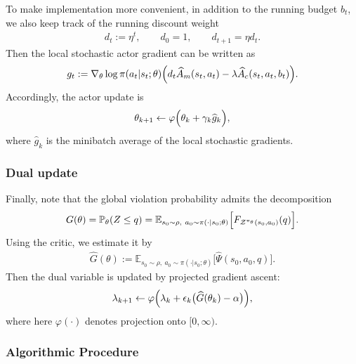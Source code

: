 To make implementation more convenient, in addition to the running budget $b_t$, we also keep track of the running discount weight
\begin{align}
    d_t:=\eta^t,
    \qquad d_0=1,
    \qquad d_{t+1}=\eta d_t.
\end{align}
Then the local stochastic actor gradient can be written as
\begin{align}
    g_t
    :=
    \nabla_{\theta}\log\pi(a_t|s_t;\theta)
    \Bigl(
        d_t\widehat{A}_m(s_t,a_t)
        -
        \lambda \widehat{A}_c(s_t,a_t,b_t)
    \Bigr).
\end{align}
Accordingly, the actor update is
\begin{align}
    \theta_{k+1}
    \gets
    \varphi\Bigl(
        \theta_k+\gamma_k \widehat{g}_k
    \Bigr),
\end{align}
where $\widehat{g}_k$ is the minibatch average of the local stochastic gradients.

\subsubsection{Dual update}

Finally, note that the global violation probability admits the decomposition
\begin{align}
    G(\theta)
    =
    \mathbb{P}_{\theta}(Z\le q)
    =
    \mathbb{E}_{s_0\sim \rho,\ a_0\sim \pi(\cdot|s_0;\theta)}
    \Bigl[
        F_{\mathcal{Z}^{\pi_{\theta}}(s_0,a_0)}(q)
    \Bigr].
\end{align}
Using the critic, we estimate it by
\begin{align}
    \widehat{G}(\theta)
    :=
    \mathbb{E}_{s_0\sim \rho,\ a_0\sim \pi(\cdot|s_0;\theta)}
    \bigl[
        \widehat{\Psi}(s_0,a_0,q)
    \bigr].
\end{align}
Then the dual variable is updated by projected gradient ascent:
\begin{align}
    \lambda_{k+1}
    \gets
    \varphi\Bigl(
        \lambda_k+\epsilon_k\bigl(\widehat{G}(\theta_k)-\alpha\bigr)
    \Bigr),
\end{align}
where here $\varphi(\cdot)$ denotes projection onto $[0,\infty)$.

\subsubsection{Algorithmic Procedure}


